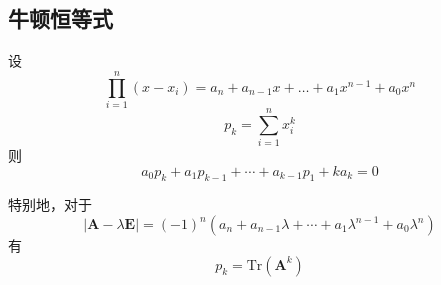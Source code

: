 \documentclass[a4paper]{article}
\begin{document}
\subsection{牛顿恒等式}

设$$\prod_{i = 1}^n{(x - x_i)} = a_n + a_{n - 1} x + \dots + a_1 x^{n - 1} + a_0 x^n$$
$$p_k = \sum_{i = 1}^n{x_i^k}$$
则$$a_0 p_k + a_1 p_{k - 1} + \cdots + a_{k - 1} p_1 + k a_k = 0$$

特别地，对于$$|\mathbf{A} - \lambda \mathbf{E}| = (-1)^n(a_n + a_{n - 1} \lambda + \cdots + a_1 \lambda^{n - 1} + a_0 \lambda^n)$$
有$$p_k = \mathrm{Tr}(\mathbf{A}^k)$$
\end{document}
